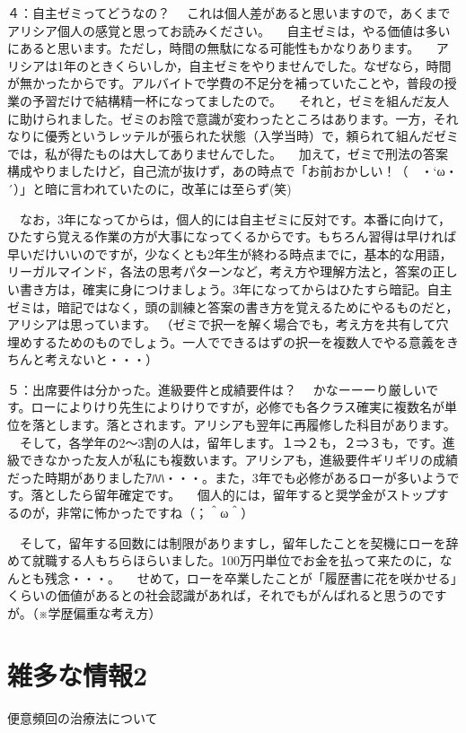 ４：自主ゼミってどうなの？
　これは個人差があると思いますので，あくまでアリシア個人の感覚と思ってお読みください。
　自主ゼミは，やる価値は多いにあると思います。ただし，時間の無駄になる可能性もかなりあります。
　アリシアは1年のときくらいしか，自主ゼミをやりませんでした。なぜなら，時間が無かったからです。アルバイトで学費の不足分を補っていたことや，普段の授業の予習だけで結構精一杯になってましたので。
　それと，ゼミを組んだ友人に助けられました。ゼミのお陰で意識が変わったところはあります。一方，それなりに優秀というレッテルが張られた状態（入学当時）で，頼られて組んだゼミでは，私が得たものは大してありませんでした。
　加えて，ゼミで刑法の答案構成やりましたけど，自己流が抜けず，あの時点で「お前おかしい！（　・`ω・´）」と暗に言われていたのに，改革には至らず(笑)

　なお，3年になってからは，個人的には自主ゼミに反対です。本番に向けて，ひたすら覚える作業の方が大事になってくるからです。もちろん習得は早ければ早いだけいいのですが，少なくとも2年生が終わる時点までに，基本的な用語，リーガルマインド，各法の思考パターンなど，考え方や理解方法と，答案の正しい書き方は，確実に身につけましょう。3年になってからはひたすら暗記。自主ゼミは，暗記ではなく，頭の訓練と答案の書き方を覚えるためにやるものだと，アリシアは思っています。
（ゼミで択一を解く場合でも，考え方を共有して穴埋めするためのものでしょう。一人でできるはずの択一を複数人でやる意義をきちんと考えないと・・・）

５：出席要件は分かった。進級要件と成績要件は？
　かなーーーり厳しいです。ローによりけり先生によりけりですが，必修でも各クラス確実に複数名が単位を落とします。落とされます。アリシアも翌年に再履修した科目があります。
　そして，各学年の2～3割の人は，留年します。１⇒２も，２⇒３も，です。進級できなかった友人が私にも複数います。アリシアも，進級要件ギリギリの成績だった時期がありましたｱﾊﾊ・・・。また，3年でも必修があるローが多いようです。落としたら留年確定です。
　個人的には，留年すると奨学金がストップするのが，非常に怖かったですね（；＾ω＾）

　そして，留年する回数には制限がありますし，留年したことを契機にローを辞めて就職する人もちらほらいました。100万円単位でお金を払って来たのに，なんとも残念・・・。
　せめて，ローを卒業したことが「履歴書に花を咲かせる」くらいの価値があるとの社会認識があれば，それでもがんばれると思うのですが。（※学歴偏重な考え方）





\section{雑多な情報2}
 便意頻回の治療法について
 
